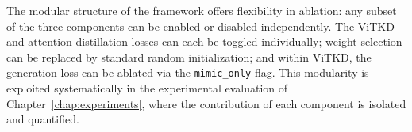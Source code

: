 The modular structure of the framework offers flexibility in ablation: any subset of the three components can be enabled or disabled independently. The ViTKD and attention distillation losses can each be toggled individually; weight selection can be replaced by standard random initialization; and within ViTKD, the generation loss can be ablated via the \texttt{mimic\_only} flag. This modularity is exploited systematically in the experimental evaluation of Chapter~\ref{chap:experiments}, where the contribution of each component is isolated and quantified.


